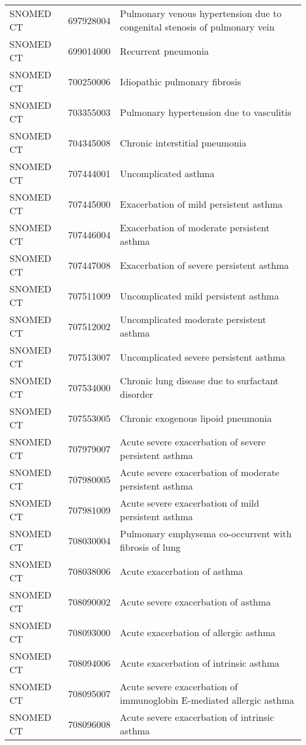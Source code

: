 \begin{table}[ht]
\begin{tabular}{lll}
  SNOMED CT & 697928004 & Pulmonary venous hypertension due to congenital stenosis of pulmonary vein \\ 
  SNOMED CT & 699014000 & Recurrent pneumonia \\ 
  SNOMED CT & 700250006 & Idiopathic pulmonary fibrosis \\ 
  SNOMED CT & 703355003 & Pulmonary hypertension due to vasculitis \\ 
  SNOMED CT & 704345008 & Chronic interstitial pneumonia \\ 
  SNOMED CT & 707444001 & Uncomplicated asthma \\ 
  SNOMED CT & 707445000 & Exacerbation of mild persistent asthma \\ 
  SNOMED CT & 707446004 & Exacerbation of moderate persistent asthma \\ 
  SNOMED CT & 707447008 & Exacerbation of severe persistent asthma \\ 
  SNOMED CT & 707511009 & Uncomplicated mild persistent asthma \\ 
  SNOMED CT & 707512002 & Uncomplicated moderate persistent asthma \\ 
  SNOMED CT & 707513007 & Uncomplicated severe persistent asthma \\ 
  SNOMED CT & 707534000 & Chronic lung disease due to surfactant disorder \\ 
  SNOMED CT & 707553005 & Chronic exogenous lipoid pneumonia \\ 
  SNOMED CT & 707979007 & Acute severe exacerbation of severe persistent asthma \\ 
  SNOMED CT & 707980005 & Acute severe exacerbation of moderate persistent asthma \\ 
  SNOMED CT & 707981009 & Acute severe exacerbation of mild persistent asthma \\ 
  SNOMED CT & 708030004 & Pulmonary emphysema co-occurrent with fibrosis of lung \\ 
  SNOMED CT & 708038006 & Acute exacerbation of asthma \\ 
  SNOMED CT & 708090002 & Acute severe exacerbation of asthma \\ 
  SNOMED CT & 708093000 & Acute exacerbation of allergic asthma \\ 
  SNOMED CT & 708094006 & Acute exacerbation of intrinsic asthma \\ 
  SNOMED CT & 708095007 & Acute severe exacerbation of immunoglobin E-mediated allergic asthma \\ 
  SNOMED CT & 708096008 & Acute severe exacerbation of intrinsic asthma \\ 

\end{tabular}
\end{table}
